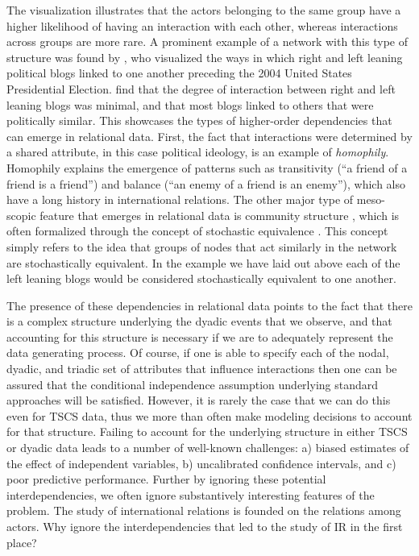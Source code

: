 The visualization illustrates that the actors belonging to the same group have a higher likelihood of having an interaction with each other, whereas interactions across groups are more rare. A prominent example of a network with this type of structure was found by \citet{adamic:glance:2005}, who visualized the ways in which right and left leaning political blogs linked to one another preceding the 2004 United States Presidential Election. \citeauthor{adamic:glance:2005} find that the degree of interaction between right and left leaning blogs was minimal, and that most blogs linked to others that were politically similar. This showcases the types of higher-order dependencies that can emerge in relational data. First, the fact that interactions were determined by a shared attribute, in this case political ideology, is an example of \textit{homophily}. Homophily explains the emergence of patterns such as transitivity (``a friend of a friend is a friend'') and balance (``an enemy of a friend is an enemy''), which also have a long history in international relations. The other major type of meso-scopic feature that emerges in relational data is community structure \citep{mucha:etal:2010}, which is often formalized through the concept of stochastic equivalence \citep{anderson:etal:1992}. This concept simply refers to the idea that groups of nodes that act similarly in the network are stochastically equivalent. In the example we have laid out above each of the left leaning blogs would be considered stochastically equivalent to one another. 

The presence of these dependencies in relational data points to the fact that there is a complex structure underlying the dyadic events that we observe, and that accounting for this structure is necessary if we are to adequately represent the data generating process. Of course, if one is able to specify each of the nodal, dyadic, and triadic set of attributes that influence interactions then one can be assured that the conditional independence assumption underlying standard approaches will be satisfied. However, it is rarely the case that we can do this even for TSCS data, thus we more than often make modeling decisions to account for that structure. Failing to account for the underlying structure in either TSCS or dyadic data leads to a number of well-known challenges: a) biased estimates of the effect of independent variables, b) uncalibrated confidence intervals, and c) poor predictive performance. Further by ignoring these potential interdependencies, we often ignore substantively interesting features of the problem. The study of international relations is founded on the relations among actors. Why ignore the interdependencies that led to the study of IR in the first place?

